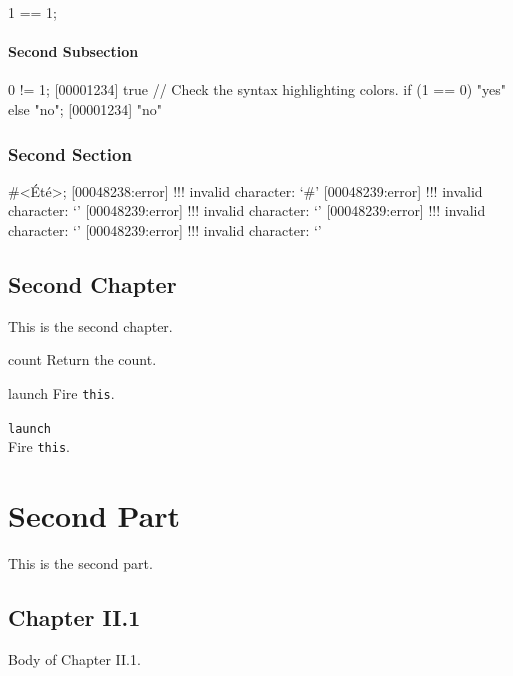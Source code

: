 \documentclass[openright,twoside,11pt]{book}
\begin{document}
\begin{urbiassert}[firstnumber=1]
1 == 1;
\end{urbiassert}

\subsection{Second Subsection}
\begin{urbiscript}
0 != 1;
[00001234] true
// Check the syntax highlighting colors.
if (1 == 0) "yes" else "no";
[00001234] "no"
\end{urbiscript}

\section{Second Section}
\begin{urbiunchecked}[escapeinside=<>]
#<Été>;
[00048238:error] !!! invalid character: `#'
[00048239:error] !!! invalid character: `'
[00048239:error] !!! invalid character: `'
[00048239:error] !!! invalid character: `'
[00048239:error] !!! invalid character: `'
\end{urbiunchecked}

\chapter{Second Chapter}

This is the second chapter.



\begin{urbiscriptapi}
\item[count]Return the count.
\item[launch]
  Fire \lstinline|this|.
\item \lstinline|launch|~\\
  Fire \lstinline|this|.

\end{urbiscriptapi}

\part{Second Part}

This is the second part.

\chapter{Chapter II.1}
Body of Chapter II.1.
\end{document}
